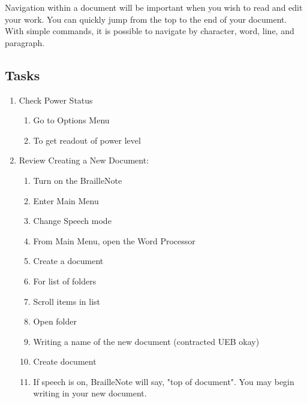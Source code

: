 \documentclass[10pt,letterpaper,twoside]{report}
\begin{document}
Navigation within a document will be important when you wish to read and edit your work. You can quickly jump from the top to the end of your document. With simple commands, it is possible to navigate by character, word, line, and paragraph. 

\subsection{Tasks}
\begin{enumerate}
	\item Check Power Status
	      \begin{enumerate}
		      \item Go to Options Menu 
		      \item To get readout of power level 
	      \end{enumerate}
	\item Review Creating a New Document:
	      \begin{enumerate}
		      \item Turn on the BrailleNote 
		      \item Enter Main Menu 
		      \item Change Speech mode 
		      \item From Main Menu, open the Word Processor 
		      \item Create a document 
		      \item For list of folders 
		      \item Scroll items in list 
		      \item Open folder 
		      \item Writing a name of the new document (contracted UEB okay)
		      \item Create document 
		      \item If speech is on, BrailleNote will say, "top of document". You may begin writing in your new document.

\end{enumerate}
\end{enumerate}
\end{document}
